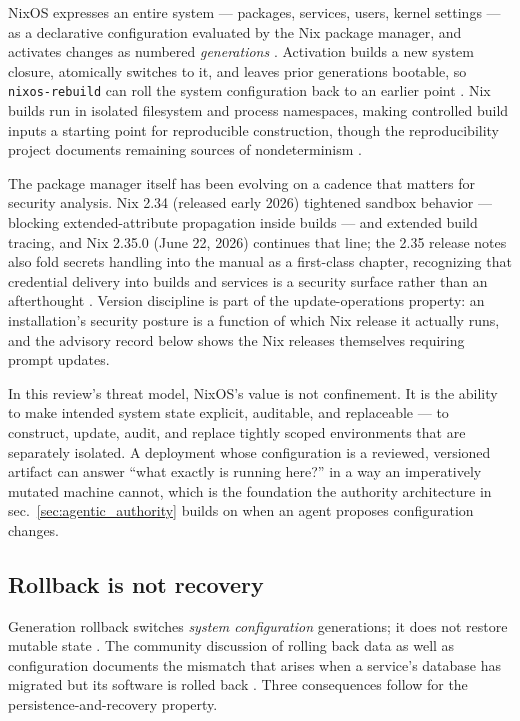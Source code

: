 \documentclass[
  english,
  9pt,
]{extarticle}
\begin{document}
NixOS expresses an entire system --- packages, services, users, kernel
settings --- as a declarative configuration evaluated by the Nix package
manager, and activates changes as numbered \emph{generations}
\citep{nixos_wiki}. Activation builds a new system closure, atomically
switches to it, and leaves prior generations bootable, so
\texttt{nixos-rebuild} can roll the system configuration back to an
earlier point \citep{nixos_rebuild_wiki}. Nix builds run in isolated
filesystem and process namespaces, making controlled build inputs a
starting point for reproducible construction, though the reproducibility
project documents remaining sources of nondeterminism
\citep{nix_sandbox_config, nixos_reproducibility}.

The package manager itself has been evolving on a cadence that matters
for security analysis. Nix 2.34 (released early 2026) tightened sandbox
behavior --- blocking extended-attribute propagation inside builds ---
and extended build tracing, and Nix 2.35.0 (June 22, 2026) continues
that line; the 2.35 release notes also fold secrets handling into the
manual as a first-class chapter, recognizing that credential delivery
into builds and services is a security surface rather than an
afterthought \citep{nix_2_35_notes}. Version discipline is part of the
update-operations property: an installation's security posture is a
function of which Nix release it actually runs, and the advisory record
below shows the Nix releases themselves requiring prompt updates.

In this review's threat model, NixOS's value is not confinement. It is
the ability to make intended system state explicit, auditable, and
replaceable --- to construct, update, audit, and replace tightly scoped
environments that are separately isolated. A deployment whose
configuration is a reviewed, versioned artifact can answer ``what
exactly is running here?'' in a way an imperatively mutated machine
cannot, which is the foundation the authority architecture in
sec.~\ref{sec:agentic_authority} builds on when an agent proposes
configuration changes.

\subsection{Rollback is not recovery}\label{rollback-is-not-recovery}

Generation rollback switches \emph{system configuration} generations; it
does not restore mutable state \citep{nixos_rebuild_wiki}. The community
discussion of rolling back data as well as configuration documents the
mismatch that arises when a service's database has migrated but its
software is rolled back \citep{nixos_rollback_data_discussion}. Three
consequences follow for the persistence-and-recovery property.
\end{document}

